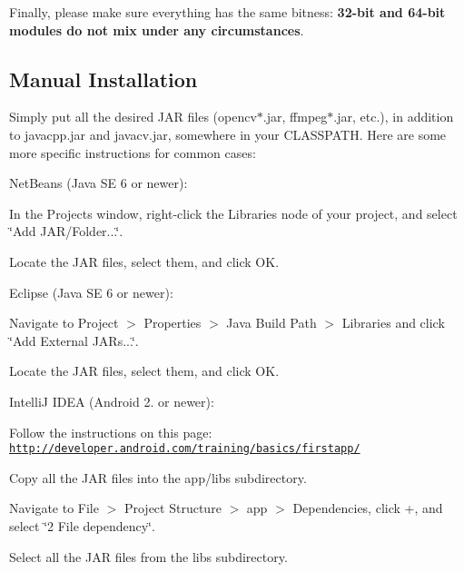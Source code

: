 Finally, please make sure everything has the same bitness\+: {\bfseries 32-\/bit and 64-\/bit modules do not mix under any circumstances}.

\subsection*{Manual Installation }

Simply put all the desired J\+A\+R files ({\ttfamily opencv$\ast$.jar}, {\ttfamily ffmpeg$\ast$.jar}, etc.), in addition to {\ttfamily javacpp.\+jar} and {\ttfamily javacv.\+jar}, somewhere in your C\+L\+A\+S\+S\+P\+A\+T\+H. Here are some more specific instructions for common cases\+:

Net\+Beans (Java S\+E 6 or newer)\+:


\begin{DoxyEnumerate}
\item In the Projects window, right-\/click the Libraries node of your project, and select \char`\"{}\+Add J\+A\+R/\+Folder...\char`\"{}.
\item Locate the J\+A\+R files, select them, and click O\+K.
\end{DoxyEnumerate}

Eclipse (Java S\+E 6 or newer)\+:


\begin{DoxyEnumerate}
\item Navigate to Project $>$ Properties $>$ Java Build Path $>$ Libraries and click \char`\"{}\+Add External J\+A\+Rs...\char`\"{}.
\item Locate the J\+A\+R files, select them, and click O\+K.
\end{DoxyEnumerate}

Intelli\+J I\+D\+E\+A (Android 2. or newer)\+:


\begin{DoxyEnumerate}
\item Follow the instructions on this page\+: \href{http://developer.android.com/training/basics/firstapp/}{\tt http\+://developer.\+android.\+com/training/basics/firstapp/}
\item Copy all the J\+A\+R files into the {\ttfamily app/libs} subdirectory.
\item Navigate to File $>$ Project Structure $>$ app $>$ Dependencies, click {\ttfamily +}, and select \char`\"{}2 File dependency\char`\"{}.
\item Select all the J\+A\+R files from the {\ttfamily libs} subdirectory.
\end{DoxyEnumerate}

